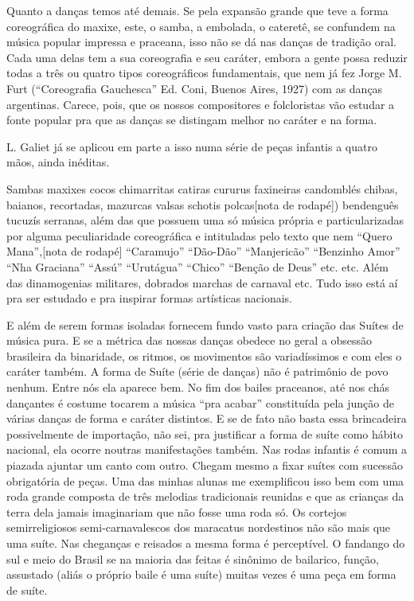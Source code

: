 Quanto a danças temos até demais. Se pela expansão grande que teve a
forma coreográfica do maxixe, este, o samba, a embolada, o cateretê, se
confundem na música popular impressa e praceana, isso não se dá nas
danças de tradição oral. Cada uma delas tem a sua coreografia e seu
caráter, embora a gente possa reduzir todas a três ou quatro tipos
coreográficos fundamentais, que nem já fez Jorge M. Furt (``Coreografia
Gauchesca'' Ed. Coni, Buenos Aires, 1927) com as danças argentinas.
Carece, pois, que os nossos compositores e folcloristas vão estudar a
fonte popular pra que as danças se distingam melhor no caráter e na
forma.

L. Galiet já se aplicou em parte a isso numa série de peças infantis a
quatro mãos, ainda inéditas.

Sambas maxixes cocos chimarritas catiras cururus faxineiras candomblés
chibas, baianos, recortadas, mazurcas valsas schotis polcas{[}nota de
rodapé{]}) bendenguês tucuzís serranas, além das que possuem uma só
música própria e particularizadas por alguma peculiaridade coreográfica
e intituladas pelo texto que nem ``Quero Mana'',{[}nota de rodapé{]}
``Caramujo'' ``Dão-Dão'' ``Manjericão'' ``Benzinho Amor'' ``Nha Graciana'' ``Assú''
``Urutágua'' ``Chico'' ``Benção de Deus'' etc. etc. Além das dinamogenias
militares, dobrados marchas de carnaval etc. Tudo isso está aí pra ser
estudado e pra inspirar formas artísticas nacionais.

E além de serem formas isoladas fornecem fundo vasto para criação das
Suítes de música pura. E se a métrica das nossas danças obedece no geral
a obsessão brasileira da binaridade, os ritmos, os movimentos são
variadíssimos e com eles o caráter também. A forma de Suíte (série de
danças) não é patrimônio de povo nenhum. Entre nós ela aparece bem. No
fim dos bailes praceanos, até nos chás dançantes é costume tocarem a
música ``pra acabar'' constituída pela junção de várias danças de forma e
caráter distintos. E se de fato não basta essa brincadeira possivelmente
de importação, não sei, pra justificar a forma de suíte como hábito
nacional, ela ocorre noutras manifestações também. Nas rodas infantis é
comum a piazada ajuntar um canto com outro. Chegam mesmo a fixar suítes
com sucessão obrigatória de peças. Uma das minhas alunas me exemplificou
isso bem com uma roda grande composta de três melodias tradicionais
reunidas e que as crianças da terra dela jamais imaginariam que não
fosse uma roda só. Os cortejos semirreligiosos semi-carnavalescos dos
maracatus nordestinos não são mais que uma suíte. Nas cheganças e
reisados a mesma forma é perceptível. O fandango do sul e meio do Brasil
se na maioria das feitas é sinônimo de bailarico, função, assustado
(aliás o próprio baile é uma suíte) muitas vezes é uma peça em forma de
suíte.


